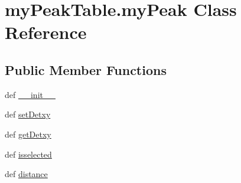 \hypertarget{classmy_peak_table_1_1my_peak}{\section{my\-Peak\-Table.\-my\-Peak Class Reference}
\label{classmy_peak_table_1_1my_peak}
}
\subsection*{Public Member Functions}
\begin{DoxyCompactItemize}
\item 
def \hyperlink{classmy_peak_table_1_1my_peak_a037a4088033f2adfaaa74c7352f70f48}{\-\_\-\-\_\-init\-\_\-\-\_\-}
\item 
def \hyperlink{classmy_peak_table_1_1my_peak_ad3e58261d15c3ac0e64876ce79e2fb65}{set\-Detxy}
\item 
def \hyperlink{classmy_peak_table_1_1my_peak_a69641e1873ad1aeb01e9addef6aee25b}{get\-Detxy}
\item 
def \hyperlink{classmy_peak_table_1_1my_peak_acd0cd543ea0c89c12ab6a336b1898f8c}{isselected}
\item 
def \hyperlink{classmy_peak_table_1_1my_peak_a95656972d93036d4f594a8dffa41ac1a}{distance}
\end{DoxyCompactItemize}
